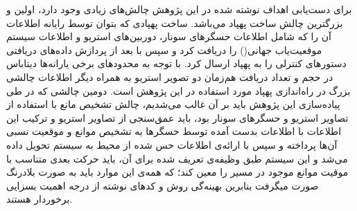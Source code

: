 برای دست‌یابی اهداف نوشته شده در این پژوهش چالش‌های زیادی وجود دارد، اولین و بزرگترین چالش ساخت پهپاد می‌باشد. ساخت پهپادی که بتوان توسط رایانه اطلاعات آن را که شامل اطلاعات حسگرهای سونار، دوربین‌های استریو و اطلاعات سیستم موقعیت‌یاب جهانی() را دریافت کرد و سپس با بعد از پردازش داده‌های دریافتی دستورهای کنترلی را به پهپاد ارسال کرد. با توجه به محدودهای برخی یارانه‌ها دیتاباس در حجم و تعداد دریافت هم‌زمان دو تصویر استریو به همراه دیگر اطلاعات چالشی بزرگ در راه‌اندازی پهپاد مورد استفاده در این پژوهش است.
 دومین چالشی که در طی پیاده‌سازی این پژوهش باید بر آن غالب می‌شدیم، چالش تشخیص مانع با استفاده از تصاویر استریو و حسگرهای سونار بود، باید عمق‌سنجی از تصاویر استریو و ترکیب این اطلاعات با اطلاعات بدست آمده توسط حسگرها به تشخیص موانع و موقعیت نسبی آن‌ها پرداخته و سپس با ارائه‌ی اطلاعات حس شده از محیط به سیستم  تحویل داده می‌شد و این سیستم طبق وظیفه‌ی تعریف شده برای آن، باید حرکت بعدی متناسب با موقیت موانع موجود در مسیر را معین کند؛ که همه‌ی این موارد باید به صورت بلادرنگ صورت میگرفت بنابرین بهینه‌گی روش و کدهای نوشته از درجه اهمیت بسزایی برخوردار هستند.